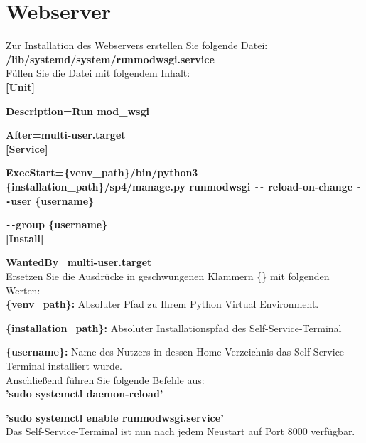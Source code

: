 \section{Webserver}
Zur Installation des Webservers erstellen Sie folgende Datei:\\

\textbf{/lib/systemd/system/runmodwsgi.service}\\

\noindent Füllen Sie die Datei mit folgendem Inhalt:\\

\textbf{[Unit]}\par
\textbf{Description=Run mod\_wsgi}\par
\textbf{After=multi-user.target}\\

\textbf{[Service]}\par
\textbf{ExecStart=\{venv\_path\}/bin/python3 \{installation\_path\}/sp4/manage.py \indent runmodwsgi \texttt{-{}-}
reload-on-change \texttt{-{}-}user} \textbf{\{username\}}\par\textbf{\texttt{-{}-}group \{username\}}\\


\textbf{[Install]}\par
\textbf{WantedBy=multi-user.target}\\

\noindent Ersetzen Sie die Ausdrücke in geschwungenen Klammern \{\} mit folgenden Werten:\\
\noindent \textbf{\{venv\_path\}:} Absoluter Pfad zu Ihrem Python Virtual Environment.\par
\noindent \textbf{\{installation\_path\}:} Absoluter Installationspfad des Self-Service-Terminal\par
\noindent \textbf{\{username\}:} Name des Nutzers in dessen Home-Verzeichnis das Self-Service-Terminal installiert wurde.\\

\noindent Anschließend führen Sie folgende Befehle aus:\\

\textbf{’sudo systemctl daemon-reload’}\par
\textbf{’sudo systemctl enable runmodwsgi.service’}\\

\noindent Das Self-Service-Terminal ist nun nach jedem Neustart auf Port 8000 verfügbar.